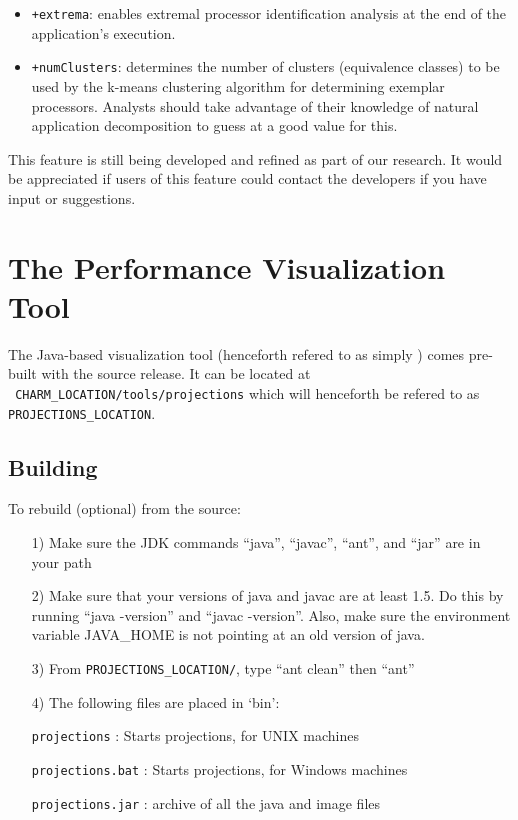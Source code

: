 \documentclass[10pt]{article}
\begin{document}
\begin{itemize}
\item
{\tt +extrema}: enables extremal processor identification analysis at
the end of the application's execution.
\item
{\tt +numClusters}: determines the number of clusters (equivalence
classes) to be used by the k-means clustering algorithm for
determining exemplar processors. Analysts should take advantage of
their knowledge of natural application decomposition to guess at a
good value for this.
\end{itemize}

This feature is still being developed and refined as part of our
research. It would be appreciated if users of this feature could
contact the developers if you have input or suggestions.

\newpage

\section{The \projections{} Performance Visualization Tool}
\label{sec::visualization}

The \projections{} Java-based visualization tool (henceforth refered
to as simply \projections{}) comes pre-built with the \charmpp{}
source release. It can be located at \\ {\tt
CHARM\_LOCATION/tools/projections} which will henceforth be refered to
as {\tt PROJECTIONS\_LOCATION}.

\subsection{Building \projections{}}

To rebuild \projections{} (optional) from the source:

\begin{enumerate}
\item[1)]
   Make sure the JDK commands ``java'', ``javac'', ``ant'',  and ``jar''
   are in your path  
\item[2)]
   Make sure that your versions of java and javac are at least 1.5. Do this by running ``java -version'' and ``javac -version''. Also, make sure the environment variable JAVA\_HOME is not pointing at an old version of java.
\item[3)]
   From {\tt PROJECTIONS\_LOCATION/}, type ``ant clean'' then ``ant''
\item[4)]
   The following files are placed in `bin':

      {\tt projections}           : Starts projections, for UNIX machines

      {\tt projections.bat}       : Starts projections, for Windows machines

      {\tt projections.jar}       : archive of all the java and image files
\end{enumerate}
\end{document}

